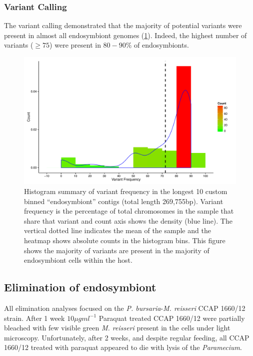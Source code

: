 \subsubsection{Variant Calling}

The variant calling demonstrated that the majority of potential
variants were present in almost all endosymbiont genomes (\cref{fig:var_contig}).
Indeed, the highest number of variants (\(\geq 75\)) were present in 
\(80-90\%\) of endosymbionts.

\begin{figure}
    \centering
    \includegraphics[width=\textwidth]{snp_variant_longest_contig.pdf}
    \caption[Endosymbiont variant count and frequency density]{
        Histogram summary of variant frequency in the longest 
        10 custom binned ``endosymbiont'' contigs (total length 269,755bp).
        Variant frequency is the percentage of total chromosomes
        in the sample that share that variant and count axis shows
        the density (blue line).  The vertical dotted line indicates
        the mean of the sample and the heatmap shows absolute counts
        in the histogram bins. This figure shows the majority
        of variants are present in the majority of endosymbiont
    cells within the host.}
    \label{fig:var_contig}
\end{figure}

\subsection{Elimination of endosymbiont}

All elimination analyses focused on the \textit{P. bursaria}-\textit{M. reisseri}
CCAP 1660/12 strain.
After 1 week \(10\mu g ml^{-1}\) Paraquat treated CCAP 1660/12 were partially bleached
with few visible green \textit{M. reisseri} present in the cells under light
microscopy.
Unfortunately, after 2 weeks, and despite regular feeding, all CCAP 1660/12
treated with paraquat appeared to die with lysis of the \textit{Paramecium}.

